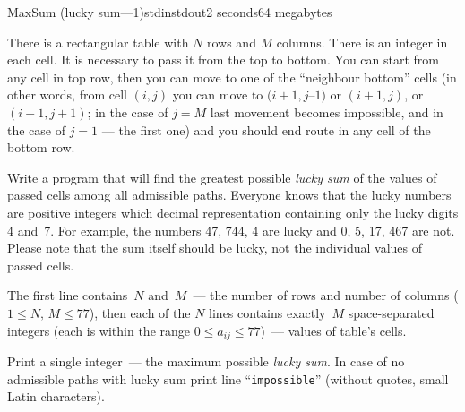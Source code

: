 \begin{problem}{MaxSum (lucky sum---1)}{stdin}{stdout}{2 seconds}{64 megabytes}

There is a rectangular table with $N$ rows and $M$ columns.
There is an integer in each cell. It is necessary to pass it from the top to bottom.
You can start from any cell in top row, then you can move to one of the ``neighbour bottom'' cells (in other words, from cell $(i,j)$ you can move to $(i+1,j$--$1)$ or $(i+1,j)$, or $(i+1,j +1)$; in the case of $j=M$ last movement becomes impossible, and in the case of $j=1$ --- the first one) and you should end route in any cell of the bottom row.

Write a program that will find the greatest possible \emph{lucky sum} of the values of passed cells among all admissible paths. Everyone knows that the lucky numbers are positive integers which decimal representation containing only the lucky digits 4 and~7. For example, the numbers 47, 744, 4 are lucky and 0, 5, 17, 467 are not. Please note that the sum itself should be lucky, not the individual values of passed cells.

\InputFile
The first line contains~$N$ and~$M$~--- the number of rows and number of columns ($1\leq N,\,M\leq 77$), then each of the $N$ lines contains exactly~$M$
space-separated integers (each is within the range $0\leq a_{ij}\leq 77$)~--- values of table's cells.

\OutputFile
Print a single integer~--- the maximum possible \emph{lucky sum}. In case of no admissible paths with lucky sum print line ``\texttt{impossible}'' (without quotes, small Latin characters).

\Examples

\begin{example}
%
\end{example}

\end{problem}
